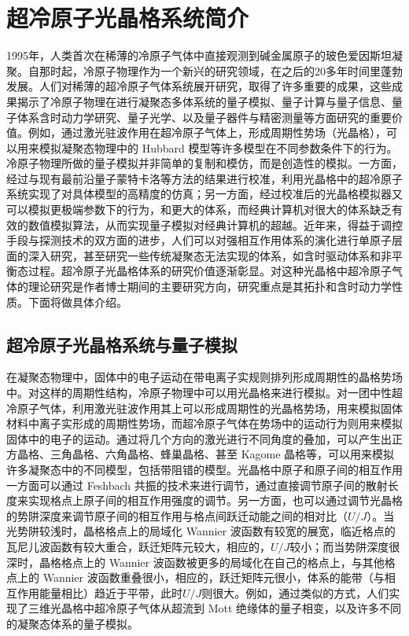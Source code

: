 \chapter{超冷原子光晶格系统简介}
\label{cha:intro}

1995年，人类首次在稀薄的冷原子气体中直接观测到碱金属原子的玻色爱因斯坦凝聚\cite{bec1995a,bec1995b}。自那时起，冷原子物理作为一个新兴的研究领域，在之后的20多年时间里蓬勃发展。人们对稀薄的超冷原子气体系统展开研究，取得了许多重要的成果，这些成果揭示了冷原子物理在进行凝聚态多体系统的量子模拟、量子计算与量子信息、量子体系含时动力学研究、量子光学、以及量子器件与精密测量等方面研究的重要价值\cite{bloch2012}。例如，通过激光驻波作用在超冷原子气体上，形成周期性势场（光晶格），可以用来模拟凝聚态物理中的 Hubbard 模型等许多模型在不同参数条件下的行为。冷原子物理所做的量子模拟并非简单的复制和模仿，而是创造性的模拟。一方面，经过与现有最前沿量子蒙特卡洛等方法的结果进行校准，利用光晶格中的超冷原子系统实现了对具体模型的高精度的仿真；另一方面，经过校准后的光晶格模拟器又可以模拟更极端参数下的行为，和更大的体系，而经典计算机对很大的体系缺乏有效的数值模拟算法，从而实现量子模拟对经典计算机的超越\cite{feynman1982,qsgoals2012}。近年来，得益于调控手段与探测技术的双方面的进步，人们可以对强相互作用体系的演化进行单原子层面的深入研究，甚至研究一些传统凝聚态无法实现的体系，如含时驱动体系和非平衡态过程。超冷原子光晶格体系的研究价值逐渐彰显。对这种光晶格中超冷原子气体的理论研究是作者博士期间的主要研究方向，研究重点是其拓扑和含时动力学性质。下面将做具体介绍。


\section{超冷原子光晶格系统与量子模拟}

在凝聚态物理中，固体中的电子运动在带电离子实规则排列形成周期性的晶格势场中。对这样的周期性结构，冷原子物理中可以用光晶格来进行模拟。对一团中性超冷原子气体，利用激光驻波作用其上可以形成周期性的光晶格势场，用来模拟固体材料中离子实形成的周期性势场，而超冷原子气体在势场中的运动行为则用来模拟固体中的电子的运动。通过将几个方向的激光进行不同角度的叠加，可以产生出正方晶格、三角晶格、六角晶格、蜂巢晶格、甚至 Kagome 晶格等，可以用来模拟许多凝聚态中的不同模型，包括带阻错的模型。光晶格中原子和原子间的相互作用一方面可以通过 Feshbach 共振的技术来进行调节\cite{feshbach2010}，通过直接调节原子间的散射长度来实现格点上原子间的相互作用强度的调节。另一方面，也可以通过调节光晶格的势阱深度来调节原子间的相互作用与格点间跃迁动能之间的相对比（$U/J$）\cite{bloch2012}。当光势阱较浅时，晶格格点上的局域化 Wannier 波函数有较宽的展宽，临近格点的瓦尼儿波函数有较大重合，跃迁矩阵元较大，相应的，$U/J$较小；而当势阱深度很深时，晶格格点上的 Wannier 波函数被更多的局域化在自己的格点上，与其他格点上的 Wannier 波函数重叠很小，相应的，跃迁矩阵元很小，体系的能带（与相互作用能量相比）趋近于平带，此时$U/J$则很大。例如，通过类似的方式，人们实现了三维光晶格中超冷原子气体从超流到 Mott 绝缘体的量子相变\cite{mott-sf-2002}，以及许多不同的凝聚态体系的量子模拟。

